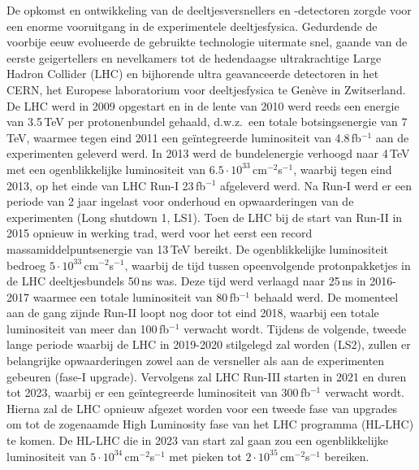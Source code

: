 De opkomst en ontwikkeling van de deeltjesversnellers en -detectoren zorgde voor een enorme
vooruitgang in de experimentele deeltjesfysica. Gedurdende de voorbije eeuw
evolueerde de gebruikte technologie uitermate snel, gaande van de eerste geigertellers en
nevelkamers tot de hedendaagse ultrakrachtige Large Hadron Collider (LHC) en 
bijhorende ultra geavanceerde 
detectoren in het CERN, het Europese laboratorium voor deeltjesfysica te
Gen\`eve in Zwitserland. De LHC werd in 2009 opgestart en in de lente van 2010 werd reeds een
energie van 3.5\,TeV per protonenbundel gehaald, d.w.z.~een totale botsingsenergie
van 7\,TeV, waarmee tegen eind 2011 een ge\"integreerde luminositeit
van 4.8\,fb$^{-1}$ aan de experimenten geleverd werd. 
In 2013 werd de bundelenergie verhoogd naar
4\,TeV met een ogenblikkelijke luminositeit van
$6.5\cdot10^{33}$\,cm$^{-2}$s$^{-1}$, waarbij tegen eind 2013, op het einde van LHC 
Run-I 23\,fb$^{-1}$ afgeleverd werd. Na Run-I werd er een
periode van 2 jaar ingelast voor onderhoud en opwaarderingen van de experimenten (Long shutdown
1, LS1). 
Toen de LHC bij de start van Run-II in 2015 opnieuw in werking trad, werd voor
het eerst een record 
massamiddelpuntsenergie 
van 13\,TeV bereikt. 
De ogenblikkelijke luminositeit bedroeg $5\cdot10^{33}$\,cm$^{-2}$s$^{-1}$, waarbij
de tijd tussen opeenvolgende protonpakketjes in de LHC deeltjesbundels  
50\,ns was. Deze tijd werd verlaagd naar 25\,ns in 2016-2017
waarmee een totale luminositeit van 80\,fb$^{-1}$ behaald werd. De momenteel
aan de gang zijnde Run-II loopt nog 
door tot eind 2018, waarbij een totale luminositeit van meer dan
100\,fb$^{-1}$ verwacht wordt. Tijdens de volgende, tweede lange periode
waarbij de LHC in 2019-2020 stilgelegd zal worden (LS2), zullen er belangrijke
opwaarderingen zowel aan de
versneller als aan de experimenten gebeuren (fase-I upgrade). 
Vervolgens zal LHC Run-III starten in 2021 en duren tot 2023, waarbij er een
ge\"integreerde luminositeit van 
300\,fb$^{-1}$ verwacht wordt. Hierna zal de LHC opnieuw afgezet
worden voor een tweede fase van upgrades om tot de zogenaamde High Luminosity
fase van het LHC programma
(HL-LHC) te komen. De HL-LHC die in 2023 van start zal gaan zou
een ogenblikkelijke luminositeit van $5\cdot10^{34}$\,cm$^{-2}$s$^{-1}$ met pieken
tot $2\cdot10^{35}$\,cm$^{-2}$s$^{-1}$ bereiken.    

